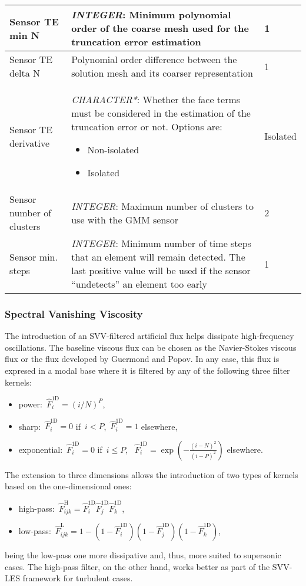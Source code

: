 \documentclass[a4paper,10pt]{report}
\begin{document}
\begin{longtable}{|l|p{10cm}|p{2.2cm}|}
Sensor TE min N & \textit{INTEGER}: Minimum polynomial order of the coarse mesh used for the truncation error estimation & 1 \\ \hline
Sensor TE delta N & Polynomial order difference between the solution mesh and its coarser representation & 1 \\ \hline
Sensor TE derivative & \textit{CHARACTER*}: Whether the face terms must be considered in the estimation of the truncation error or not. Options are:
    \begin{itemize}
        \item Non-isolated
        \item Isolated
    \end{itemize} & Isolated \\ \hline
Sensor number of clusters & \textit{INTEGER}: Maximum number of clusters to use with the GMM sensor & 2 \\ \hline
Sensor min. steps & \textit{INTEGER}: Minimum number of time steps that an element will remain detected. The last positive value will be used if the sensor ``undetects'' an element too early & 1 \\ \hline
\end{longtable}

\subsubsection{Spectral Vanishing Viscosity}

The introduction of an SVV-filtered artificial flux helps dissipate high-frequency oscillations. The baseline viscous flux can be chosen as the Navier-Stokes viscous flux or the flux developed by Guermond and Popov. In any case, this flux is expresed in a modal base where it is filtered by any of the following three filter kernels:
%
\begin{itemize}
    \item power:~$\hat{F}^{\text{1D}}_i = (i/N)^P$,
    \item sharp:~$\hat{F}^{\text{1D}}_i = 0$ if~$i<P$,~$\hat{F}^{\text{1D}}_i = 1$ elsewhere,
    \item exponential:~$\hat{F}^{\text{1D}}_i = 0$ if~$i \leq P$, ~$\hat{F}^{\text{1D}}_i=\exp\left(-\frac{(i-N)^2}{(i-P)^2}\right)$ elsewhere.
\end{itemize}
%
The extension to three dimensions allows the introduction of two types of kernels based on the one-dimensional ones:
%
\begin{itemize}
    \item high-pass:~$\hat{F}^{\text{H}}_{ijk} = \hat{F}^{\text{1D}}_i \hat{F}^{\text{1D}}_j \hat{F}^{\text{1D}}_k$,
    \item low-pass:~$\hat{F}^{\text{L}}_{ijk} = 1 - \left(1-\hat{F}^{\text{1D}}_i\right)\left(1-\hat{F}^{\text{1D}}_j\right)\left(1-\hat{F}^{\text{1D}}_k\right)$,
\end{itemize}
%
being the low-pass one more dissipative and, thus, more suited to supersonic cases. The high-pass filter, on the other hand, works better as part of the SVV-LES framework for turbulent cases.
\end{document}
